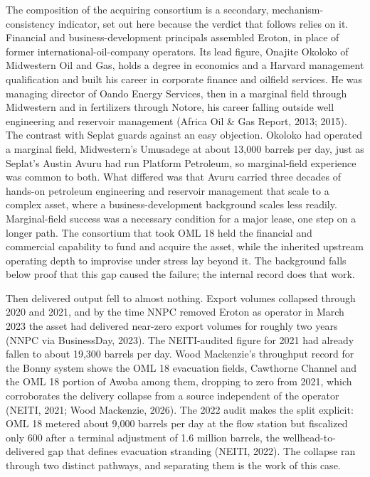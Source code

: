 The composition of the acquiring consortium is a secondary,
mechanism-consistency indicator, set out here because the verdict that
follows relies on it. Financial and business-development principals
assembled Eroton, in place of former international-oil-company
operators. Its lead figure, Onajite Okoloko of Midwestern Oil and Gas,
holds a degree in economics and a Harvard management qualification and
built his career in corporate finance and oilfield services. He was
managing director of Oando Energy Services, then in a marginal field
through Midwestern and in fertilizers through Notore, his career falling
outside well engineering and reservoir management (Africa Oil \& Gas
Report, 2013; 2015). The contrast with Seplat guards against an easy
objection. Okoloko had operated a marginal field, Midwestern's Umusadege
at about 13,000 barrels per day, just as Seplat's Austin Avuru had run
Platform Petroleum, so marginal-field experience was common to both.
What differed was that Avuru carried three decades of hands-on petroleum
engineering and reservoir management that scale to a complex asset,
where a business-development background scales less readily.
Marginal-field success was a necessary condition for a major lease, one
step on a longer path. The consortium that took OML 18 held the
financial and commercial capability to fund and acquire the asset, while
the inherited upstream operating depth to improvise under stress lay
beyond it. The background falls below proof that this gap caused the
failure; the internal record does that work.

Then delivered output fell to almost nothing. Export volumes collapsed
through 2020 and 2021, and by the time NNPC removed Eroton as operator
in March 2023 the asset had delivered near-zero export volumes for
roughly two years (NNPC via BusinessDay, 2023). The NEITI-audited figure
for 2021 had already fallen to about 19,300 barrels per day. Wood
Mackenzie's throughput record for the Bonny system shows the OML 18
evacuation fields, Cawthorne Channel and the OML 18 portion of Awoba
among them, dropping to zero from 2021, which corroborates the delivery
collapse from a source independent of the operator (NEITI, 2021; Wood
Mackenzie, 2026). The 2022 audit makes the split explicit: OML 18
metered about 9,000 barrels per day at the flow station but fiscalized
only 600 after a terminal adjustment of 1.6 million barrels, the
wellhead-to-delivered gap that defines evacuation stranding (NEITI,
2022). The collapse ran through two distinct pathways, and separating
them is the work of this case.

